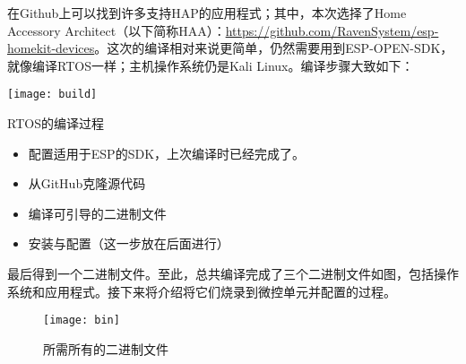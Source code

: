\par 在Github上可以找到许多支持HAP的应用程式；其中，本次选择了Home Accessory Architect（以下简称HAA）：\url{https://github.com/RavenSystem/esp-homekit-devices}。这次的编译相对来说更简单，仍然需要用到ESP-OPEN-SDK，就像编译RTOS一样；主机操作系统仍是Kali Linux。编译步骤大致如下：

\begin{marginfigure}[0cm]
	\texttt{[image: build]}
	\caption[build]{RTOS的编译过程}
\end{marginfigure}

\begin{itemize}
	\item 配置适用于ESP的SDK，上次编译时已经完成了。
	\item 从GitHub克隆源代码
	\item 编译可引导的二进制文件
	\item 安装与配置（这一步放在后面进行）
\end{itemize}

最后得到一个二进制文件。至此，总共编译完成了三个二进制文件如图，包括操作系统和应用程式。接下来将介绍将它们烧录到微控单元并配置的过程。

\begin{figure*}[h!]
	\texttt{[image: bin]}
	\caption[bin]{所需所有的二进制文件}
\end{figure*}
